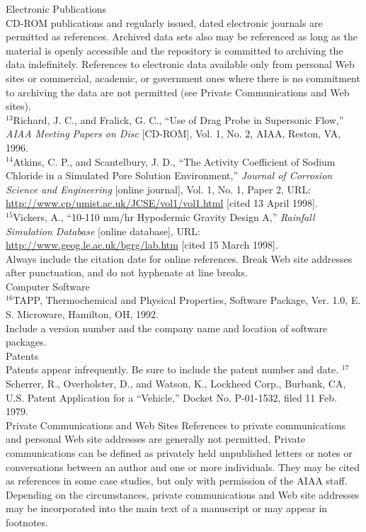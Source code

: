 Electronic Publications \\
CD-ROM publications and regularly issued, dated electronic journals are permitted as references. Archived data sets also may be referenced as long as the material is openly accessible and the repository is committed to archiving the data indefinitely. References to electronic data available only from personal Web sites or commercial, academic, or government ones where there is no commitment to archiving the data are not permitted (see Private Communications and Web sites). \\

$^{13}$Richard, J. C., and Fralick, G. C., “Use of Drag Probe in Supersonic Flow,” \textit{AIAA Meeting Papers on Disc} [CD-ROM], Vol. 1, No. 2, AIAA, Reston, VA, 1996. \\
$^{14}$Atkins, C. P., and Scantelbury, J. D., “The Activity Coefficient of Sodium Chloride in a Simulated Pore Solution Environment,” \textit{Journal of Corrosion Science and Engineering} [online journal], Vol. 1, No. 1, Paper 2, URL: \underline{http://www.cp/umist.ac.uk/JCSE/vol1/vol1.html} [cited 13 April 1998]. \\
$^{15}$Vickers, A., “10-110 mm/hr Hypodermic Gravity Design A,” \textit{Rainfall Simulation Database} [online database], URL: \underline{http://www.geog.le.ac.uk/bgrg/lab.htm} [cited 15 March 1998]. \\

Always include the citation date for online references. Break Web site addresses after punctuation, and do not hyphenate at line breaks. \\

Computer Software \\
$^{16}$TAPP, Thermochemical and Physical Properties, Software Package, Ver. 1.0, E. S. Microware, Hamilton, OH, 1992. \\

Include a version number and the company name and location of software packages. \\

Patents \\
Patents appear infrequently. Be sure to include the patent number and date.
$^{17}$Scherrer, R., Overholster, D., and Watson, K., Lockheed Corp., Burbank, CA, U.S. Patent Application for a “Vehicle,” Docket No. P-01-1532, filed 11 Feb. 1979. \\

Private Communications and Web Sites
References to private communications and personal Web site addresses are generally not permitted. Private communications can be defined as privately held unpublished letters or notes or conversations between an author and one or more individuals. They may be cited as references in some case studies, but only with permission of the AIAA staff. Depending on the circumstances, private communications and Web site addresses may be incorporated into the main text of a manuscript or may appear in footnotes. \\

